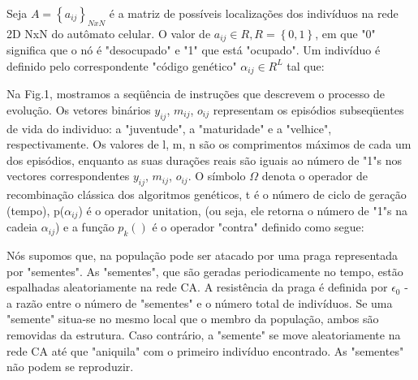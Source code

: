 \documentclass{article}
\begin{document}
Seja $A = \left \{a_{ij}\right \}_{NxN}$ é a matriz de possíveis localizações dos indivíduos na rede 2D NxN do autômato celular. O valor de $a_{ij} \in R, R = \left \{0,1\right \}$, em que "0" significa que o nó é "desocupado" e "1" que está "ocupado". Um indivíduo é definido pelo correspondente "código genético" $\alpha _{ij} \in R^{L}$ tal que:


Na Fig.1, mostramos a seqüência de instruções que descrevem o processo de evolução. Os vetores binários $y_{ij}$, $m_{ij}$, $o_{ij}$ representam os episódios subseqüentes de vida do individuo: a "juventude", a "maturidade" e a "velhice", respectivamente. Os valores de l, m, n são os comprimentos máximos de cada um dos episódios, enquanto as suas durações reais são iguais ao número de "1"s nos vectores correspondentes $y_{ij}$, $m_{ij}$, $o_{ij}$. O símbolo  $\Omega$ denota o operador de recombinação clássica dos algoritmos genéticos, t é o número de ciclo de geração (tempo), p($\alpha_{ij}$) é o operador unitation, (ou seja, ele retorna o número de "1"s na cadeia $\alpha_{ij}$) e a função $p_{k}()$ é o operador "contra" definido como segue:


Nós supomos que, na população pode ser atacado por uma praga representada por "sementes". As "sementes", que são geradas periodicamente no tempo, estão espalhadas aleatoriamente na rede CA. A resistência da praga é definida por $\epsilon_{0}$ - a razão entre o número de "sementes" e o número total de indivíduos. Se uma "semente" situa-se no mesmo local que o membro da população, ambos são removidas da estrutura. Caso contrário, a "semente" se move aleatoriamente na rede CA até que "aniquila" com o primeiro indivíduo encontrado. As "sementes" não podem se reproduzir.
\end{document}

